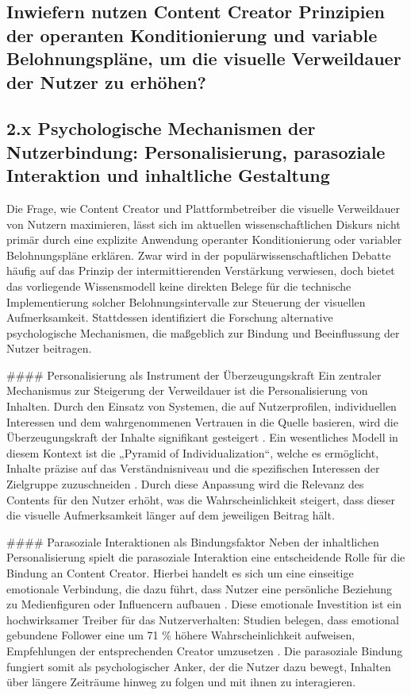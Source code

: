 \documentclass[11pt,a4paper]{article}
\begin{document}
\subsection{Inwiefern nutzen Content Creator Prinzipien der operanten Konditionierung und variable Belohnungspläne, um die visuelle Verweildauer der Nutzer zu erhöhen?}

\subsection{2.x Psychologische Mechanismen der Nutzerbindung: Personalisierung, parasoziale Interaktion und inhaltliche Gestaltung}

Die Frage, wie Content Creator und Plattformbetreiber die visuelle Verweildauer von Nutzern maximieren, lässt sich im aktuellen wissenschaftlichen Diskurs nicht primär durch eine explizite Anwendung operanter Konditionierung oder variabler Belohnungspläne erklären. Zwar wird in der populärwissenschaftlichen Debatte häufig auf das Prinzip der intermittierenden Verstärkung verwiesen, doch bietet das vorliegende Wissensmodell keine direkten Belege für die technische Implementierung solcher Belohnungsintervalle zur Steuerung der visuellen Aufmerksamkeit. Stattdessen identifiziert die Forschung alternative psychologische Mechanismen, die maßgeblich zur Bindung und Beeinflussung der Nutzer beitragen.

\#\#\#\# Personalisierung als Instrument der Überzeugungskraft Ein zentraler Mechanismus zur Steigerung der Verweildauer ist die Personalisierung von Inhalten. Durch den Einsatz von Systemen, die auf Nutzerprofilen, individuellen Interessen und dem wahrgenommenen Vertrauen in die Quelle basieren, wird die Überzeugungskraft der Inhalte signifikant gesteigert \autocite{crossref_10_22215_etd_2019_13484}. Ein wesentliches Modell in diesem Kontext ist die „Pyramid of Individualization“, welche es ermöglicht, Inhalte präzise auf das Verständnisniveau und die spezifischen Interessen der Zielgruppe zuzuschneiden \autocite{crossref_10_22215_etd_2019_13484}. Durch diese Anpassung wird die Relevanz des Contents für den Nutzer erhöht, was die Wahrscheinlichkeit steigert, dass dieser die visuelle Aufmerksamkeit länger auf dem jeweiligen Beitrag hält.

\#\#\#\# Parasoziale Interaktionen als Bindungsfaktor Neben der inhaltlichen Personalisierung spielt die parasoziale Interaktion eine entscheidende Rolle für die Bindung an Content Creator. Hierbei handelt es sich um eine einseitige emotionale Verbindung, die dazu führt, dass Nutzer eine persönliche Beziehung zu Medienfiguren oder Influencern aufbauen \autocite{grey_grey_5d5c282590c448fc8776b04f78a08de5,europepmc_42073973}. Diese emotionale Investition ist ein hochwirksamer Treiber für das Nutzerverhalten: Studien belegen, dass emotional gebundene Follower eine um 71 \% höhere Wahrscheinlichkeit aufweisen, Empfehlungen der entsprechenden Creator umzusetzen \autocite{grey_grey_5d5c282590c448fc8776b04f78a08de5}. Die parasoziale Bindung fungiert somit als psychologischer Anker, der die Nutzer dazu bewegt, Inhalten über längere Zeiträume hinweg zu folgen und mit ihnen zu interagieren.
\end{document}
